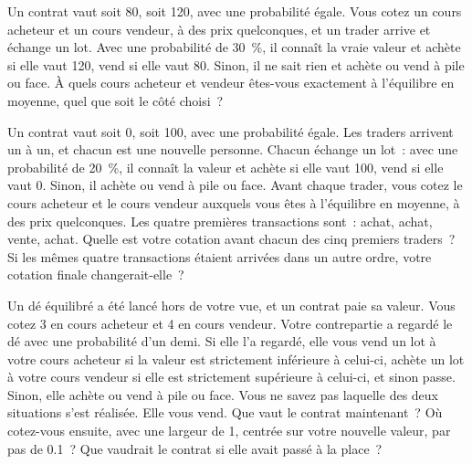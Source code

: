 \begin{question}\label{iq:iv2:making-a-market:12}
Un contrat vaut soit 80, soit 120, avec une probabilité égale. Vous cotez un cours acheteur et un cours vendeur, à des prix quelconques, et un trader arrive et échange un lot. Avec une probabilité de 30~\%, il connaît la vraie valeur et achète si elle vaut 120, vend si elle vaut 80. Sinon, il ne sait rien et achète ou vend à pile ou face. À quels cours acheteur et vendeur êtes-vous exactement à l'équilibre en moyenne, quel que soit le côté choisi~?
\end{question}

\begin{question}\label{iq:iv2:making-a-market:13}
Un contrat vaut soit 0, soit 100, avec une probabilité égale. Les traders arrivent un à un, et chacun est une nouvelle personne. Chacun échange un lot~: avec une probabilité de 20~\%, il connaît la valeur et achète si elle vaut 100, vend si elle vaut 0. Sinon, il achète ou vend à pile ou face. Avant chaque trader, vous cotez le cours acheteur et le cours vendeur auxquels vous êtes à l'équilibre en moyenne, à des prix quelconques. Les quatre premières transactions sont~: achat, achat, vente, achat. Quelle est votre cotation avant chacun des cinq premiers traders~? Si les mêmes quatre transactions étaient arrivées dans un autre ordre, votre cotation finale changerait-elle~?
\end{question}

\begin{question}\label{iq:iv2:making-a-market:14}
Un dé équilibré a été lancé hors de votre vue, et un contrat paie sa valeur. Vous cotez 3 en cours acheteur et 4 en cours vendeur. Votre contrepartie a regardé le dé avec une probabilité d'un demi. Si elle l'a regardé, elle vous vend un lot à votre cours acheteur si la valeur est strictement inférieure à celui-ci, achète un lot à votre cours vendeur si elle est strictement supérieure à celui-ci, et sinon passe. Sinon, elle achète ou vend à pile ou face. Vous ne savez pas laquelle des deux situations s'est réalisée. Elle vous vend. Que vaut le contrat maintenant~? Où cotez-vous ensuite, avec une largeur de 1, centrée sur votre nouvelle valeur, par pas de 0.1~? Que vaudrait le contrat si elle avait passé à la place~?
\end{question}

